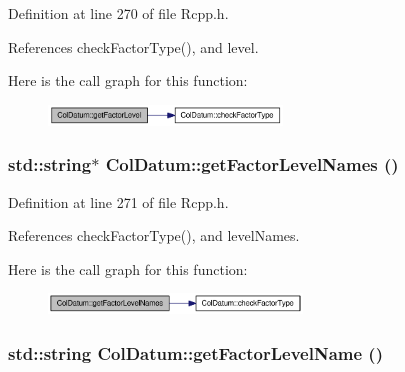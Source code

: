 Definition at line 270 of file Rcpp.h.

References checkFactorType(), and level.

Here is the call graph for this function:\nopagebreak
\begin{figure}[H]
\begin{center}
\leavevmode
\includegraphics[width=176pt]{classColDatum_df3716db9f3483f3cd255a4c05823479_cgraph}
\end{center}
\end{figure}
\hypertarget{classColDatum_4376ad852efcf177fad6f168a8f44877}{
\subsubsection[getFactorLevelNames]{\setlength{\rightskip}{0pt plus 5cm}std::string$\ast$ ColDatum::getFactorLevelNames ()}}
\label{classColDatum_4376ad852efcf177fad6f168a8f44877}




Definition at line 271 of file Rcpp.h.

References checkFactorType(), and levelNames.

Here is the call graph for this function:\nopagebreak
\begin{figure}[H]
\begin{center}
\leavevmode
\includegraphics[width=191pt]{classColDatum_4376ad852efcf177fad6f168a8f44877_cgraph}
\end{center}
\end{figure}
\hypertarget{classColDatum_012df5970083052c2348cbda9ed646bb}{
\subsubsection[getFactorLevelName]{\setlength{\rightskip}{0pt plus 5cm}std::string ColDatum::getFactorLevelName ()}}
\label{classColDatum_012df5970083052c2348cbda9ed646bb}




